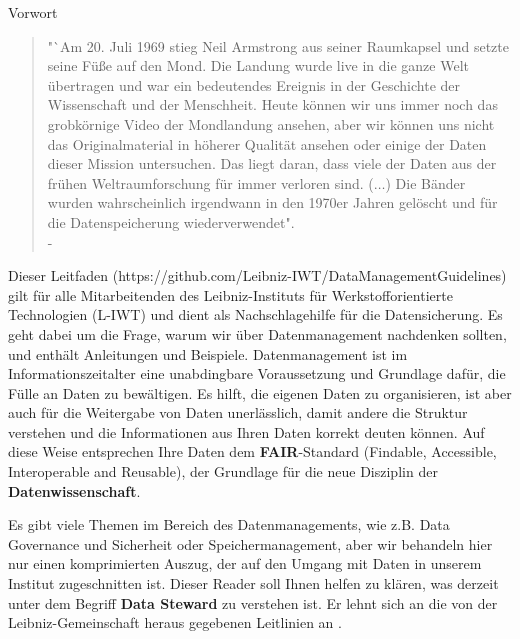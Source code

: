 \thispagestyle{empty}
\begin{center}
  \large\headerfont{}\textcolor{iwtdark}{Vorwort}
\end{center}

\begin{quote}
  "`Am 20. Juli 1969 stieg Neil Armstrong aus seiner Raumkapsel und setzte
  seine Füße auf den Mond. Die Landung wurde live in die ganze Welt übertragen
  und war ein bedeutendes Ereignis in der Geschichte der Wissenschaft und der
  Menschheit. Heute können wir uns immer noch das grobkörnige Video der
  Mondlandung ansehen, aber wir können uns nicht das Originalmaterial in höherer
  Qualität ansehen oder einige der Daten dieser Mission untersuchen. Das
  liegt daran, dass viele der Daten aus der frühen Weltraumforschung für immer
  verloren sind. ($\ldots$) Die Bänder wurden wahrscheinlich irgendwann in den 1970er
  Jahren gelöscht und für die Datenspeicherung wiederverwendet". \\
  \null\hfill - \citeauthor{briney2015}\cite{briney2015}
\end{quote}

\noindent Dieser Leitfaden (https://github.com/Leibniz-IWT/DataManagementGuidelines) gilt für alle Mitarbeitenden des Leibniz-Instituts für Werkstofforientierte Technologien (L-IWT) und
dient als Nachschlagehilfe für die Datensicherung. Es geht dabei um die Frage,
warum wir über Datenmanagement nachdenken sollten, und enthält Anleitungen und
Beispiele. Datenmanagement ist im Informationszeitalter eine unabdingbare
Voraussetzung und Grundlage dafür, die Fülle an Daten zu bewältigen. Es hilft,
die eigenen Daten zu organisieren, ist aber auch für die Weitergabe von Daten
unerlässlich, damit andere die Struktur verstehen und die Informationen aus
Ihren Daten korrekt deuten können. Auf diese Weise entsprechen Ihre Daten dem
\textbf{FAIR}-Standard (Findable, Accessible, Interoperable and Reusable), der
Grundlage für die neue Disziplin der \textbf{Datenwissenschaft}.

Es gibt viele Themen im Bereich des Datenmanagements, wie z.B. Data Governance
und Sicherheit oder Speichermanagement, aber wir behandeln hier nur einen
komprimierten Auszug, der auf den Umgang mit Daten in unserem Institut
zugeschnitten ist. Dieser Reader soll Ihnen helfen zu klären, was derzeit unter dem Begriff \textbf{Data Steward} zu verstehen ist. Er lehnt sich an die von der Leibniz-Gemeinschaft heraus gegebenen Leitlinien an \cite{leibniz2018}.
